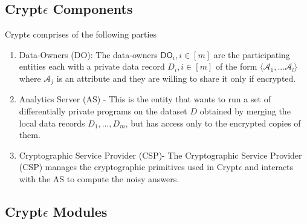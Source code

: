 \subsection{Crypt$\epsilon$ Components}
Crypt$\epsilon$ comprises of the following parties\begin{enumerate}
 \item Data-Owners (\textsf{DO}): The data-owners $\textsf{DO}_i, i \in [m]$ are the participating entities each with a
private data record $D_i, i \in [m]$ of the form $\langle \mathcal{A}_1,...\mathcal{A}_l\rangle$ where $\mathcal{A}_j$ is an attribute and they are willing to share it only if encrypted.    \item Analytics Server (\textsf{AS}) - This is the entity that wants to run a set of differentially private programs on the dataset $D$ obtained by merging the local data records $D_1, ... , D_m$, but has
access only to the encrypted copies of them. 
\item Cryptographic Service Provider (\textsf{CSP})-
 The Cryptographic Service Provider (\textsf{CSP}) manages the cryptographic primitives used in Crypt$\epsilon$ and interacts with the \textsf{AS} to compute the
noisy answers. 
\end{enumerate}
\subsection{Crypt$\epsilon$ Modules}

